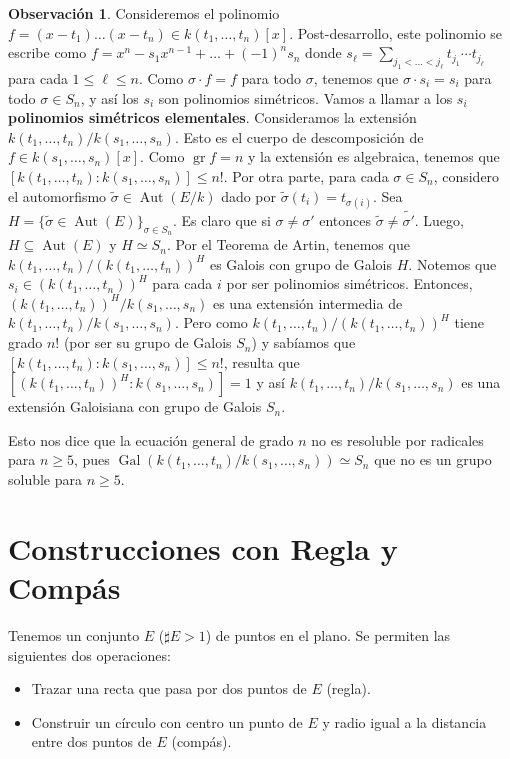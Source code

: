\documentclass[12pt]{book}
\theoremstyle{definition}
\newtheorem{obs}[teo]{Observación}
\DeclareMathOperator{\Aut}{Aut}
\DeclareMathOperator{\gr}{gr}
\DeclareMathOperator{\Gal}{Gal}
\begin{document}
\begin{obs}
Consideremos el polinomio $f=(x-t_1)\ldots (x-t_n)\in k(t_1,\ldots, t_n)[x]$. Post-desarrollo, este polinomio se escribe como $f=x^n - s_1x^{n-1}+\ldots + (-1)^n s_n$ donde $s_\ell = \displaystyle\sum_{j_1< \ldots < j_\ell} t_{j_1}\cdots t_{j_\ell}$ para cada $1\leq \ell\leq n$. Como $\sigma\cdot f=f$ para todo $\sigma$, tenemos que $\sigma\cdot s_i = s_i$ para todo $\sigma\in S_n$, y así los $s_i$ son polinomios simétricos. Vamos a llamar a los $s_i$ \textbf{polinomios simétricos elementales}. Consideramos la extensión $k(t_1,\ldots , t_n)/k(s_1,\ldots , s_n)$. Esto es el cuerpo de descomposición de $f\in k(s_1,\ldots , s_n)[x]$. Como $\gr f = n$ y la extensión es algebraica, tenemos que $[k(t_1,\ldots, t_n):k(s_1,\ldots , s_n)]\leq n!$. Por otra parte, para cada $\sigma\in S_n$, considero el automorfismo $\widetilde{\sigma}\in \Aut(E/k)$ dado por $\widetilde{\sigma}(t_i) = t_{\sigma(i)}$. Sea $H=\{\widetilde{\sigma}\in\Aut(E)\}_{\sigma\in S_n}$. Es claro que si $\sigma\neq \sigma'$ entonces $\widetilde{\sigma}\neq\widetilde{\sigma'}$. Luego, $H\subseteq \Aut(E)$ y $H\simeq S_n$. Por el Teorema de Artin, tenemos que $k(t_1,\ldots ,t_n)/(k(t_1,\ldots ,t_n))^H$ es Galois con grupo de Galois $H$. Notemos que $s_i\in (k(t_1,\ldots ,t_n))^H$ para cada $i$ por ser polinomios simétricos. Entonces, $(k(t_1,\ldots ,t_n))^H/k(s_1,\ldots ,s_n)$ es una extensión intermedia de $k(t_1,\ldots ,t_n)/k(s_1,\ldots ,s_n)$. Pero como $k(t_1,\ldots ,t_n)/(k(t_1,\ldots ,t_n))^H$ tiene grado $n!$ (por ser su grupo de Galois $S_n$) y sabíamos que $[k(t_1,\ldots ,t_n):k(s_1,\ldots ,s_n)]\leq n!$, resulta que $[(k(t_1,\ldots ,t_n))^H : k(s_1,\ldots ,s_n)]=1$ y así $k(t_1,\ldots ,t_n)/k(s_1,\ldots ,s_n)$ es una extensión Galoisiana con grupo de Galois $S_n$.

Esto nos dice que la ecuación general de grado $n$ no es resoluble por radicales para $n\geq 5$, pues $\Gal(k(t_1,\ldots ,t_n)/k(s_1,\ldots ,s_n))\simeq S_n$ que no es un grupo soluble para $n\geq 5$.
\end{obs}

\section{Construcciones con Regla y Compás}

Tenemos un conjunto $E$ ($\sharp E>1$) de puntos en el plano. Se permiten las siguientes dos operaciones: \begin{itemize}\item Trazar una recta que pasa por dos puntos de $E$ (regla). \item Construir un círculo con centro un punto de $E$ y radio igual a la distancia entre dos puntos de $E$ (compás).\end{itemize}
\end{document}
